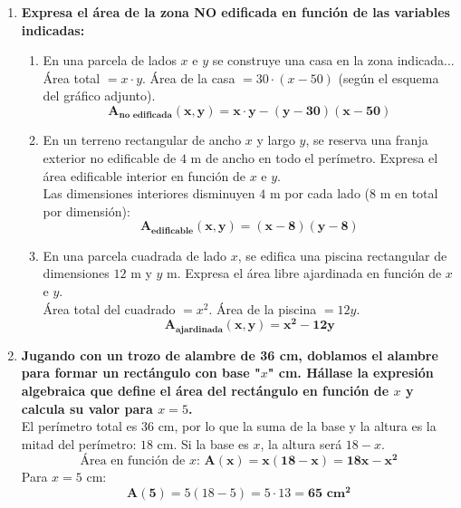 \documentclass[11pt,a4paper]{article}
\begin{document}
\begin{enumerate}[label=\textbf{\arabic*.}, leftmargin=*]
\begin{enumerate}[label=\alph*), itemsep=0.8em]
            \item Un rectángulo tiene una altura que mide $6\text{ cm}$. Expresa su diagonal y su área en función de su base $x$.\\
            $$\text{Diagonal: } \mathbf{d(x) = \sqrt{x^2 + 6^2} = \sqrt{x^2 + 36}}$$
            $$\text{Área: } \mathbf{A(x) = 6x}$$
        \end{enumerate}

    \item \textbf{Expresa el área de la zona NO edificada en función de las variables indicadas:}
        \begin{enumerate}[label=\alph*), itemsep=1.5em]
            \item En una parcela de lados $x$ e $y$ se construye una casa en la zona indicada...\\
             Área total $= x \cdot y$. Área de la casa $= 30 \cdot (x - 50)$ (según el esquema del gráfico adjunto).
            $$\mathbf{A_{\text{no edificada}}(x, y) = x \cdot y - (y-30)(x - 50)}$$

            \item En un terreno rectangular de ancho $x$ y largo $y$, se reserva una franja exterior no edificable de $4\text{ m}$ de ancho en todo el perímetro. Expresa el área edificable interior en función de $x$ e $y$.\\
             Las dimensiones interiores disminuyen $4\text{ m}$ por cada lado ($8\text{ m}$ en total por dimensión):
            $$\mathbf{A_{\text{edificable}}(x, y) = (x - 8)(y - 8)}$$

            \item En una parcela cuadrada de lado $x$, se edifica una piscina rectangular de dimensiones $12\text{ m}$ y $y\text{ m}$. Expresa el área libre ajardinada en función de $x$ e $y$.\\
             Área total del cuadrado $= x^2$. Área de la piscina $= 12y$.
            $$\mathbf{A_{\text{ajardinada}}(x, y) = x^2 - 12y}$$
        \end{enumerate}

    \item \textbf{Jugando con un trozo de alambre de 36 cm, doblamos el alambre para formar un rectángulo con base "$x$" cm. Hállase la expresión algebraica que define el área del rectángulo en función de $x$ y calcula su valor para $x = 5$.}\\
    El perímetro total es $36\text{ cm}$, por lo que la suma de la base y la altura es la mitad del perímetro: $18\text{ cm}$.
    Si la base es $x$, la altura será $18 - x$.
    $$\text{Área en función de } x\text{: } \mathbf{A(x) = x(18 - x) = 18x - x^2}$$
    Para $x = 5\text{ cm}$:
    $$\mathbf{A(5)} = 5(18 - 5) = 5 \cdot 13 = \mathbf{65\text{ cm}^2}$$

\end{enumerate}
\end{document}
